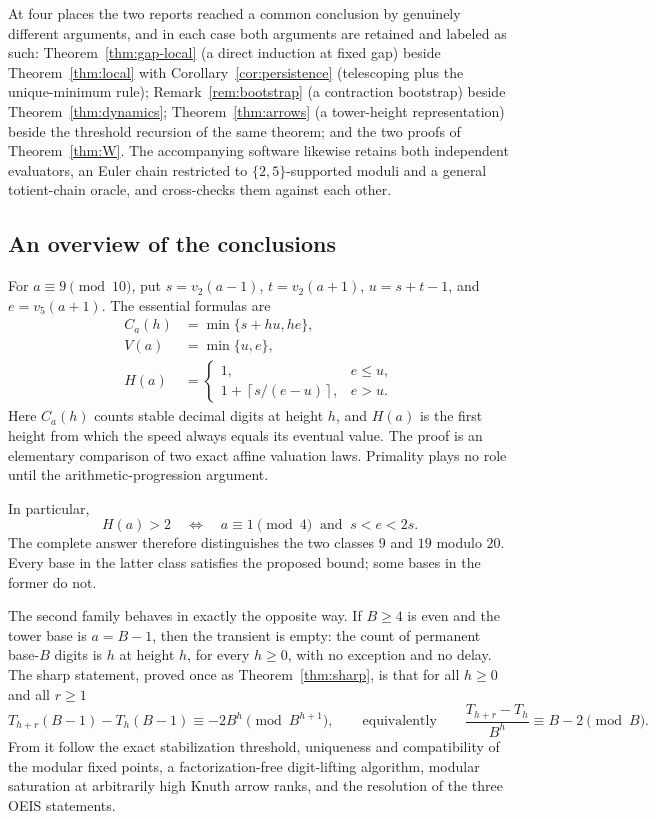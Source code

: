 \documentclass[11pt,letterpaper]{article}
\numberwithin{equation}{section}
\theoremstyle{definition}
\theoremstyle{remark}
\newcommand{\ceil}[1]{\left\lceil #1\right\rceil}
\begin{document}
At four places the two reports reached a common conclusion by genuinely different arguments, and in each case both arguments are retained and labeled as such: Theorem~\ref{thm:gap-local} (a direct induction at fixed gap) beside Theorem~\ref{thm:local} with Corollary~\ref{cor:persistence} (telescoping plus the unique-minimum rule); Remark~\ref{rem:bootstrap} (a contraction bootstrap) beside Theorem~\ref{thm:dynamics}; Theorem~\ref{thm:arrows} (a tower-height representation) beside the threshold recursion of the same theorem; and the two proofs of Theorem~\ref{thm:W}. The accompanying software likewise retains both independent evaluators, an Euler chain restricted to $\{2,5\}$-supported moduli and a general totient-chain oracle, and cross-checks them against each other.

\subsection{An overview of the conclusions}

For $a\equiv9\pmod{10}$, put $s=v_2(a-1)$, $t=v_2(a+1)$, $u=s+t-1$, and $e=v_5(a+1)$. The essential formulas are
\begin{align}
 C_a(h)&=\min\{s+hu,he\},\label{eq:overview-count}\\
 V(a)&=\min\{u,e\},\label{eq:overview-speed}\\
 H(a)&=\begin{cases}
 1,&e\le u,\\
 1+\ceil{s/(e-u)},&e>u.
 \end{cases}\label{eq:overview-onset}
\end{align}
Here $C_a(h)$ counts stable decimal digits at height $h$, and $H(a)$ is the first height from which the speed always equals its eventual value. The proof is an elementary comparison of two exact affine valuation laws. Primality plays no role until the arithmetic-progression argument.

In particular,
\[
 H(a)>2\quad\Longleftrightarrow\quad
 a\equiv1\pmod4\ \text{ and }\ s<e<2s.
\]
The complete answer therefore distinguishes the two classes $9$ and $19$ modulo $20$. Every base in the latter class satisfies the proposed bound; some bases in the former do not.

The second family behaves in exactly the opposite way. If $B\ge4$ is even and the tower base is $a=B-1$, then the transient is empty: the count of permanent base-$B$ digits is $h$ at height $h$, for every $h\ge0$, with no exception and no delay. The sharp statement, proved once as Theorem~\ref{thm:sharp}, is that for all $h\ge0$ and all $r\ge1$
\[
 T_{h+r}(B-1)-T_h(B-1)\equiv-2B^h\pmod{B^{h+1}},
 \qquad\text{equivalently}\qquad
 \frac{T_{h+r}-T_h}{B^h}\equiv B-2\pmod B .
\]
From it follow the exact stabilization threshold, uniqueness and compatibility of the modular fixed points, a factorization-free digit-lifting algorithm, modular saturation at arbitrarily high Knuth arrow ranks, and the resolution of the three OEIS statements.
\end{document}
